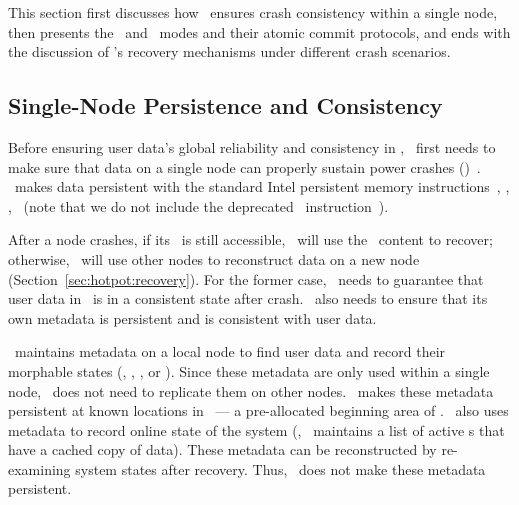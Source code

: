 This section first discusses how \hotpot\ ensures crash consistency within a single node,
then presents the \mrmw\ and \mrsw\ modes and their atomic commit protocols, %
and ends with the discussion of \hotpot's recovery mechanisms under different crash scenarios.

\subsection{Single-Node Persistence and Consistency}
\label{sec:hotpot:singleconsistency}

Before ensuring user data's global reliability and consistency in \dsnvm,
\hotpot\ first needs to make sure that data on a single node can properly sustain power crashes (\rcs)~\cite{Memory-Persistency}.
\hotpot\ makes data persistent with the standard Intel persistent memory instructions~\cite{Delegated-persist},
\ie, \clflush, \mfence\ (note that we do not include the deprecated \pcommit\ instruction~\cite{Deprecating-PCOMMIT}).

After a node crashes, if its \nvm\ is still accessible, \hotpot\ will use the \nvm\ content to recover;
otherwise, \hotpot\ will use other nodes to reconstruct data on a new node (Section~\ref{sec:hotpot:recovery}).
For the former case, \hotpot\ needs to guarantee that user data in \dsnvm\ is in a consistent state after crash.
\hotpot\ also needs to ensure that its own metadata is persistent and is consistent with user data.

\hotpot\ maintains metadata on a local node to find user data and record their morphable states (\ie, \committed, \dirty, or \redundant).
Since these metadata are only used within a single node, \hotpot\ does not need to replicate them on other nodes.
\hotpot\ makes these metadata persistent at known locations in \nvm\ ---
a pre-allocated beginning area of \nvm.
\hotpot\ also uses metadata to record online state of the system (\eg, \on\ maintains a list of active \dn{}s that have a cached copy of data).
These metadata can be reconstructed by re-examining system states after recovery.
Thus, \hotpot\ does not make these metadata persistent.

